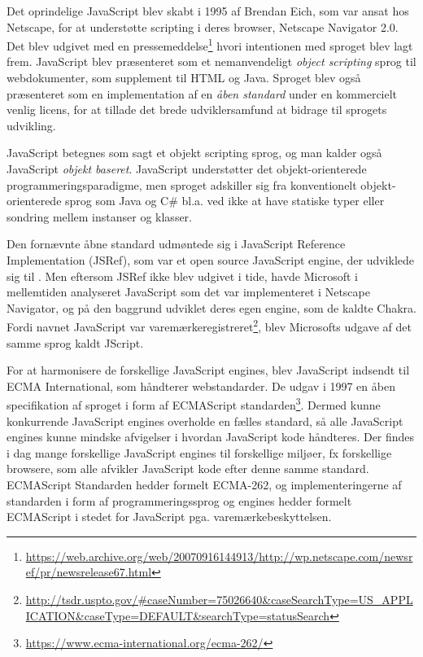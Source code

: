 \documentclass[]{article}
\begin{document}
Det oprindelige JavaScript blev skabt i 1995 af Brendan Eich, som var
ansat hos Netscape, for at understøtte scripting i deres browser,
Netscape Navigator 2.0. Det blev udgivet med en pressemeddelse\footnote{\url{https://web.archive.org/web/20070916144913/http://wp.netscape.com/newsref/pr/newsrelease67.html}}
hvori intentionen med sproget blev lagt frem. JavaScript blev
præsenteret som et nemanvendeligt \emph{object scripting} sprog til
webdokumenter, som supplement til HTML og Java. Sproget blev også
præsenteret som en implementation af en \emph{åben standard} under en
kommercielt venlig licens, for at tillade det brede udviklersamfund at
bidrage til sprogets udvikling.

JavaScript betegnes som sagt et objekt scripting sprog, og man kalder
også JavaScript \emph{objekt baseret}. JavaScript understøtter det
objekt-orienterede programmeringsparadigme, men sproget adskiller sig
fra konventionelt objekt-orienterede sprog som Java og C\# bl.a. ved
ikke at have statiske typer eller sondring mellem instanser og klasser.

Den fornævnte åbne standard udmøntede sig i JavaScript Reference
Implementation (JSRef), som var et open source JavaScript engine, der
udviklede sig til . Men eftersom JSRef ikke blev udgivet i tide, havde
Microsoft i mellemtiden analyseret JavaScript som det var implementeret
i Netscape Navigator, og på den baggrund udviklet deres egen engine, som
de kaldte Chakra. Fordi navnet JavaScript var
varemærkeregistreret\footnote{\url{http://tsdr.uspto.gov/\#caseNumber=75026640\&caseSearchType=US_APPLICATION\&caseType=DEFAULT\&searchType=statusSearch}},
blev Microsofts udgave af det samme sprog kaldt JScript.

For at harmonisere de forskellige JavaScript engines, blev JavaScript
indsendt til ECMA International, som håndterer webstandarder. De udgav i
1997 en åben specifikation af sproget i form af ECMAScript
standarden\footnote{\url{https://www.ecma-international.org/ecma-262/}}.
Dermed kunne konkurrende JavaScript engines overholde en fælles
standard, så alle JavaScript engines kunne mindske afvigelser i hvordan
JavaScript kode håndteres. Der findes i dag mange forskellige JavaScript
engines til forskellige miljøer, fx forskellige browsere, som alle
afvikler JavaScript kode efter denne samme standard. ECMAScript
Standarden hedder formelt ECMA-262, og implementeringerne af standarden
i form af programmeringssprog og engines hedder formelt ECMAScript i
stedet for JavaScript pga. varemærkebeskyttelsen.
\end{document}
